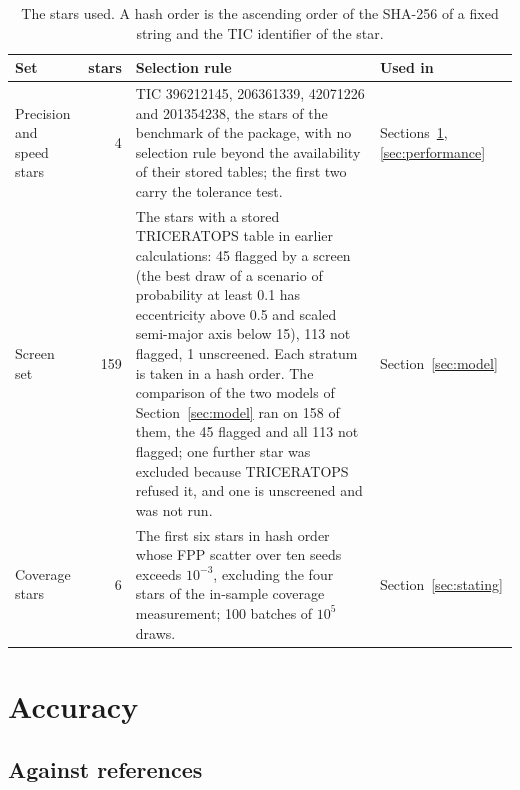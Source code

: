 \documentclass[11pt]{article}
\begin{document}
\begin{table}[ht]
\centering
\caption{The stars used. A hash order is the ascending order of the SHA-256 of a fixed string and the TIC identifier of the star.}\label{tab:samples}
\footnotesize
\begin{tabular}{>{\raggedright\arraybackslash}p{2.4cm}r>{\raggedright\arraybackslash}p{7.2cm}>{\raggedright\arraybackslash}p{3.2cm}}
\toprule
Set & stars & Selection rule & Used in \\
\midrule
Precision and speed stars & 4 & TIC 396212145, 206361339, 42071226 and 201354238, the stars of the benchmark of the package, with no selection rule beyond the availability of their stored tables; the first two carry the tolerance test. & Sections~\ref{sec:accuracy}, \ref{sec:performance} \\
Screen set & 159 & The stars with a stored TRICERATOPS table in earlier calculations: 45 flagged by a screen (the best draw of a scenario of probability at least 0.1 has eccentricity above 0.5 and scaled semi-major axis below 15), 113 not flagged, 1 unscreened. Each stratum is taken in a hash order. The comparison of the two models of Section~\ref{sec:model} ran on 158 of them, the 45 flagged and all 113 not flagged; one further star was excluded because TRICERATOPS refused it, and one is unscreened and was not run. & Section~\ref{sec:model} \\
Coverage stars & 6 & The first six stars in hash order whose FPP scatter over ten seeds exceeds $10^{-3}$, excluding the four stars of the in-sample coverage measurement; 100 batches of $10^{5}$ draws. & Section~\ref{sec:stating} \\
\bottomrule
\end{tabular}
\end{table}

\section{Accuracy}\label{sec:accuracy}

\subsection{Against references}
\end{document}
